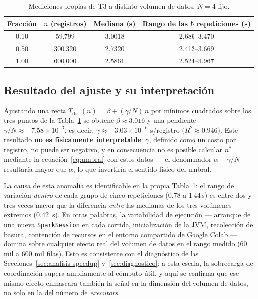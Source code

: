 \documentclass[11pt,a4paper]{article}
\begin{document}
    \begin{table}[h]
        \centering
        \caption{Mediciones propias de T3 a distinto volumen de datos, $N=4$ fijo.}
        \label{tab:volumen-t3}
        \begin{tabular}{cccc}
            \toprule
            \textbf{Fracción} & \textbf{$n$ (registros)} & \textbf{Mediana (\si{\second})} & \textbf{Rango de las 5 repeticiones (\si{\second})} \\
            \midrule
            0.10 & 59{,}799  & 3.0018 & 2.686--3.470 \\
            0.50 & 300{,}320 & 2.7320 & 2.412--3.669 \\
            1.00 & 600{,}000 & 2.5861 & 2.524--3.967 \\
            \bottomrule
        \end{tabular}
    \end{table}

    \subsection{Resultado del ajuste y su interpretación}

    Ajustando una recta $T_{\text{dist}}(n) = \beta + (\gamma/N)\,n$ por
    mínimos cuadrados sobre los tres puntos de la
    Tabla~\ref{tab:volumen-t3} se obtiene $\beta \approx 3.016$ y una
    pendiente $\gamma/N \approx -7.58 \times 10^{-7}$, es decir,
    $\gamma \approx -3.03 \times 10^{-6}$ \si{\second}/registro
    ($R^2 \approx 0.946$). Este resultado \textbf{no es físicamente
    interpretable}: $\gamma$, definido como un costo por registro, no
    puede ser negativo, y en consecuencia no es posible calcular
    $n^{*}$ mediante la ecuación~\eqref{eq:umbral} con estos datos --- el
    denominador $\alpha - \gamma/N$ resultaría mayor que $\alpha$, lo que
    invertiría el sentido físico del umbral.

    La causa de esta anomalía es identificable en la propia
    Tabla~\ref{tab:volumen-t3}: el rango de variación \emph{dentro} de
    cada grupo de cinco repeticiones (0.78 a 1.44\,\si{\second}) es entre
    dos y tres veces mayor que la diferencia \emph{entre} las medianas de
    los tres volúmenes extremos (\SI{0.42}{\second}). En otras palabras,
    la variabilidad de ejecución --- arranque de una nueva
    \texttt{SparkSession} en cada corrida, inicialización de la JVM,
    recolección de basura, contención de recursos en el entorno
    compartido de Google Colab --- domina sobre cualquier efecto real del
    volumen de datos en el rango medido (60 mil a 600 mil filas). Esto es
    consistente con el diagnóstico de las Secciones~\ref{sec:analisis-speedup}
    y~\ref{sec:diagnostico}: a esta escala, la sobrecarga de coordinación
    supera ampliamente al cómputo útil, y aquí se confirma que ese mismo
    efecto enmascara también la señal en la dimensión del volumen de
    datos, no solo en la del número de \emph{executors}.
\end{document}
